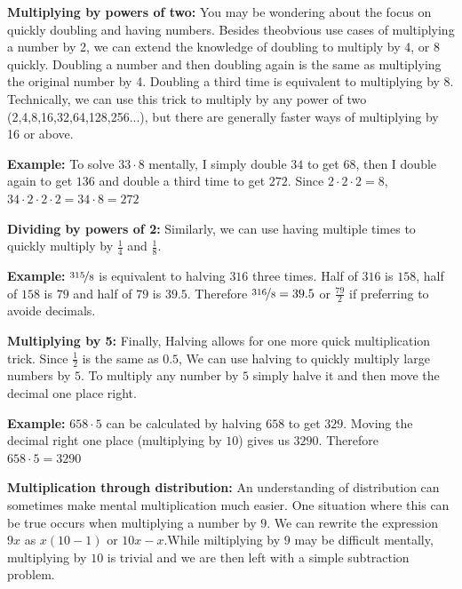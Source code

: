 \documentclass{article}
\begin{document}
	\textbf{Multiplying by powers of two:} You may be wondering about the focus on quickly doubling and having numbers. Besides theobvious use cases of multiplying a number by 2, we can extend the knowledge of doubling to multiply by 4, or 8 quickly. Doubling a number and then doubling again is the same as multiplying the original number by 4. Doubling a third time is equivalent to multiplying by 8. Technically, we can use this trick to multiply by any power of two (2,4,8,16,32,64,128,256...), but there are generally faster ways of multiplying by 16 or above.

    \bigskip
	
	\textbf{Example:} To solve $33\cdot8$ mentally, I simply double $34$ to get $68$, then I double again to get $136$ and double a third time to get $272$. Since $2\cdot2\cdot2=8$, $34\cdot2\cdot2\cdot2=34\cdot8=272$ 


\bigskip
\bigskip

\textbf{Dividing by powers of 2: }Similarly, we can use having multiple times to quickly multiply by $\frac{1}{4}$ and $\frac{1}{8}$. 

\bigskip

\textbf{Example:} $\nicefrac{315}{8}$ is equivalent to halving $316$ three times. Half of $316$ is $158$, half of $158$ is $79$ and half of $79$ is $39.5$. Therefore $\nicefrac{316}{8}=39.5$ or $\frac{79}{2}$ if preferring to avoide decimals.

\bigskip
\bigskip

\textbf{Multiplying by 5: }Finally, Halving allows for one more quick multiplication trick. Since $\frac{1}{2}$ is the same as $0.5$, We can use halving to quickly multiply large numbers by $5$. To multiply any number by $5$ simply halve it and then move the decimal one place right. 

\bigskip

\textbf{Example:} $658\cdot5$ can be calculated by halving $658$ to get $329$. Moving the decimal right one place (multiplying by $10$) gives us $3290$. Therefore $658\cdot5=3290$


\bigskip
\bigskip

	\textbf{Multiplication through distribution:} An understanding of distribution can sometimes make mental multiplication much easier. One situation where this can be true occurs when multiplying a number by $9$. We can rewrite the expression $9x$ as $x(10-1)$ or $10x-x$.While miltiplying by $9$ may be difficult mentally, multiplying by $10$ is trivial and we are then left with a simple subtraction problem.
\end{document}
